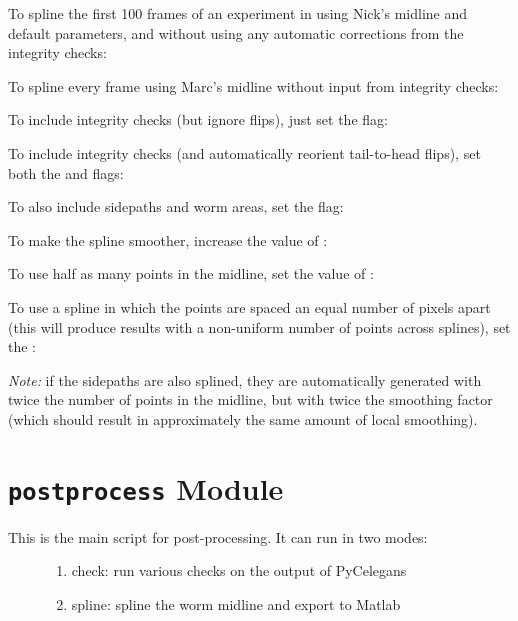 \documentclass[letterpaper,10pt,openany,oneside]{sphinxmanual}
\begin{document}
To spline the first 100 frames of an experiment in 
using Nick's midline and default parameters, and without using any automatic
corrections from the integrity checks:


To spline every frame using Marc's midline without input from integrity checks:


To include integrity checks (but ignore flips), just set the  flag:


To include integrity checks (and automatically reorient tail-to-head flips), set both the  and  flags:


To also include sidepaths and worm areas, set the  flag:


To make the spline smoother, increase the value of :


To use half as many points in the midline, set the value of :


To use a spline in which the points are spaced an equal number of pixels apart (this will produce results with a non-uniform number of points across splines), set the :


\emph{Note:} if the sidepaths are also splined, they are automatically generated with twice the number of points in the midline, but with twice the smoothing factor (which should result in approximately the same amount of local smoothing).


\chapter{\texttt{postprocess} Module}
\label{index:module-postprocess}\label{index:postprocess-module}\begin{description}
\item[{This is the main script for post-processing. It can run in two modes:}] \leavevmode\begin{enumerate}
\item {} 
check: run various checks on the output of PyCelegans

\item {} 
spline: spline the worm midline and export to Matlab

\end{enumerate}

\end{description}
\end{document}
